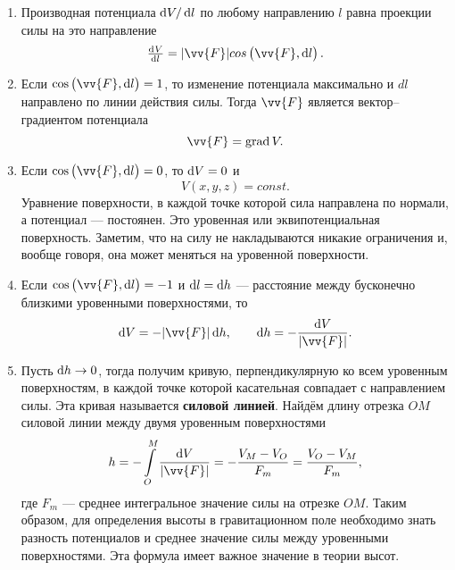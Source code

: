 \documentclass[11pt, a4paper]{article}
\theoremstyle{plain}
\theoremstyle{definition}
\theoremstyle{remark}
\begin{document}
\begin{enumerate}
    \item Производная потенциала $\dif V/ \dif l$ по любому направлению $l$ равна проекции силы на
        это направление
        \begin{equation*}
            \od{V}{l} =  |\vv{F}|cos\left( \vv{F}, \dif l \right).
        \end{equation*}
    \item Если $\cos\left( \vv{F}, \dif l \right) = 1$, то изменение потенциала максимально и
        $dl$ направлено по линии действия силы. Тогда $\vv{F}$ является вектор--градиентом
        потенциала
        \begin{equation*}
            \vv{F} = \textrm{grad}\,V.
        \end{equation*}
    \item Если $\cos\left( \vv{F}, \dif l \right) = 0$, то $\dif V = 0$ и 
        \begin{equation*}
            V\left( x, y, z \right) = const.
        \end{equation*}
        Уравнение поверхности, в каждой точке которой сила направлена по нормали, а потенциал ---
        постоянен. Это уровенная или эквипотенциальная поверхность. Заметим, что на силу не
        накладываются никакие ограничения и, вообще говоря, она может меняться на уровенной
        поверхности.
    \item Если $\cos\left( \vv{F}, \dif l \right) = -1$ и $\dif l = \dif h$ --- расстояние между
        бусконечно близкими уровенными поверхностями, то
        \begin{equation*}
            \dif V = - |\vv{F}| \dif h, \qquad \dif h = -\dfrac{\dif V}{|\vv{F}|}.     
        \end{equation*}
    \item Пусть $\dif h\to 0$, тогда получим кривую, перпендикулярную ко всем уровенным
        поверхностям, в каждой точке которой касательная совпадает с направлением силы. Эта кривая
        называется \textbf{силовой линией}. Найдём длину отрезка $OM$ силовой линии между двумя уровенным
        поверхностями
        \begin{equation*}
            h = -\int\limits_{O}^{M} \dfrac{\dif V}{|\vv{F}|} = - \dfrac{V_M - V_O}{F_m} =
            \dfrac{V_O - V_M}{F_m},
        \end{equation*}
        где $F_m$ --- среднее интегральное значение силы на отрезке $OM$. Таким образом, для
        определения высоты в гравитационном поле необходимо знать разность потенциалов и среднее
        значение силы между уровенными поверхностями. Эта формула имеет важное значение в теории
        высот.
\end{enumerate}

\end{document}
